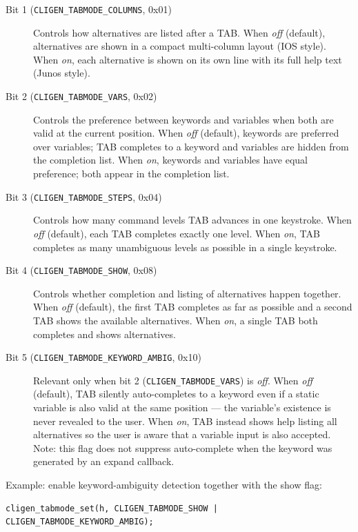 \documentclass[a4paper, 10pt] {article}
\begin{document}
\begin{description}
\item[Bit 1 ({\tt CLIGEN\_TABMODE\_COLUMNS}, 0x01)]
  Controls how alternatives are listed after a TAB.
  When \emph{off} (default), alternatives are shown in a compact multi-column
  layout (IOS style).
  When \emph{on}, each alternative is shown on its own line with its full help
  text (Junos style).

\item[Bit 2 ({\tt CLIGEN\_TABMODE\_VARS}, 0x02)]
  Controls the preference between keywords and variables when both are valid
  at the current position.
  When \emph{off} (default), keywords are preferred over variables; TAB
  completes to a keyword and variables are hidden from the completion list.
  When \emph{on}, keywords and variables have equal preference; both appear
  in the completion list.

\item[Bit 3 ({\tt CLIGEN\_TABMODE\_STEPS}, 0x04)]
  Controls how many command levels TAB advances in one keystroke.
  When \emph{off} (default), each TAB completes exactly one level.
  When \emph{on}, TAB completes as many unambiguous levels as possible in a
  single keystroke.

\item[Bit 4 ({\tt CLIGEN\_TABMODE\_SHOW}, 0x08)]
  Controls whether completion and listing of alternatives happen together.
  When \emph{off} (default), the first TAB completes as far as possible and a second
  TAB shows the available alternatives.
  When \emph{on}, a single TAB both completes and shows alternatives.

\item[Bit 5 ({\tt CLIGEN\_TABMODE\_KEYWORD\_AMBIG}, 0x10)]
  Relevant only when bit 2 ({\tt CLIGEN\_TABMODE\_VARS}) is \emph{off}.
  When \emph{off} (default), TAB silently auto-completes to a keyword even
  if a static variable is also valid at the same position --- the variable's
  existence is never revealed to the user.
  When \emph{on}, TAB instead shows help listing all alternatives so the user
  is aware that a variable input is also accepted.
  Note: this flag does not suppress auto-complete when the keyword was generated
  by an expand callback.

\end{description}

Example: enable keyword-ambiguity detection together with the show flag:
\begin{verbatim}
cligen_tabmode_set(h, CLIGEN_TABMODE_SHOW | CLIGEN_TABMODE_KEYWORD_AMBIG);
\end{verbatim}
\end{document}
